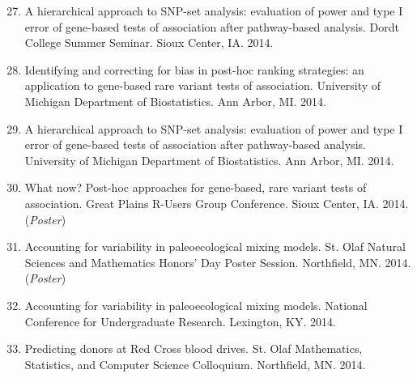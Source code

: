 \documentclass[margin]{res}
\newenvironment{benumerate}[1]{
    \let\oldItem\item
    \def\item{\addtocounter{enumi}{-2}\oldItem}
    
    \begin{enumerate}
    \setcounter{enumi}{#1}
    \addtocounter{enumi}{1}
}{
    \end{enumerate}
}
\begin{document}
\begin{resume}
\begin{benumerate}{26}
\item %
A hierarchical approach to SNP-set analysis: evaluation of power and type I error of gene-based tests of association after pathway-based analysis. Dordt College Summer Seminar. Sioux Center, IA. 2014.

\item %
Identifying and correcting for bias in post-hoc ranking strategies: an application to gene-based rare variant tests of association. University of Michigan Department of Biostatistics. Ann Arbor, MI. 2014.

\item %
A hierarchical approach to SNP-set analysis: evaluation of power and type I error of gene-based tests of association after pathway-based analysis. University of Michigan Department of Biostatistics. Ann Arbor, MI. 2014.


\item %
What now? Post-hoc approaches for gene-based, rare variant tests of association. Great Plains R-Users Group Conference. Sioux Center, IA. 2014. (\textit{Poster})

\item %
Accounting for variability in paleoecological mixing models. St. Olaf Natural Sciences and Mathematics Honors’ Day Poster Session. Northfield, MN. 2014. (\textit{Poster})


\item %
Accounting for variability in paleoecological mixing models. National Conference for Undergraduate Research. Lexington, KY. 2014.

\item %
Predicting donors at Red Cross blood drives. St. Olaf Mathematics, Statistics, and Computer Science Colloquium. Northfield, MN. 2014.


\end{benumerate}
\end{resume}
\end{document}

